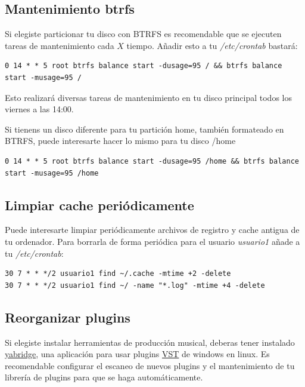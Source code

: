 \documentclass[12pt]{article}
\begin{document}
\subsection{Mantenimiento btrfs}

Si elegiste particionar tu disco con BTRFS es recomendable que se ejecuten tareas de mantenimiento cada $X$ tiempo. Añadir esto a tu \emph{/etc/crontab} bastará:

\begin{lstlisting}[basicstyle=\scriptsize\ttfamily]
0 14 * * 5 root btrfs balance start -dusage=95 / && btrfs balance start -musage=95 /
\end{lstlisting}

Esto realizará diversas tareas de mantenimiento en tu disco principal todos los viernes a las 14:00.

Si tienens un disco diferente para tu partición home, también formateado en BTRFS, puede interesarte hacer lo mismo para tu disco /home

\begin{lstlisting}[basicstyle=\scriptsize\ttfamily]
0 14 * * 5 root btrfs balance start -dusage=95 /home && btrfs balance start -musage=95 /home
\end{lstlisting}

\subsection{Limpiar cache periódicamente}

Puede interesarte limpiar periódicamente archivos de registro y cache antigua de tu ordenador. Para borrarla de forma periódica para el usuario \emph{usuario1} añade a tu \emph{/etc/crontab}:

\begin{verbatim}
30 7 * * */2 usuario1 find ~/.cache -mtime +2 -delete
30 7 * * */2 usuario1 find ~/ -name "*.log" -mtime +4 -delete
\end{verbatim}

\subsection{Reorganizar plugins}

Si elegiste instalar herramientas de producción musical, deberas tener instalado \href{https://github.com/robbert-vdh/yabridge}{yabridge}, una aplicación para usar plugins \href{https://es.wikipedia.org/wiki/Virtual_Studio_Technology}{VST} de windows en linux. Es recomendable configurar el escaneo de nuevos plugins y el mantenimiento de tu librería de plugins para que se haga automáticamente.
\end{document}
